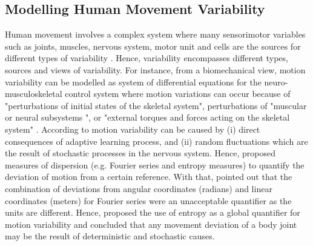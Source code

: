 \subsection{Modelling Human Movement Variability}
Human movement involves a complex system where many sensorimotor 
variables such as joints, muscles, nervous system, motor unit and cells 
are the sources for different types of variability \citep{newell1993}.
Hence, variability encompasses different types, sources and views of 
variability.
For instance, from a biomechanical view, motion variability can be modelled
as system of differential equations for the neuro-musculoskeletal 
control system where motion variations can occur because of 
"perturbations of initial states of the skeletal system",
perturbations of "muscular or neural subsystems ",
or "external torques and forces acting on the skeletal system" 
\citep[p. 13]{hatze1986}.
According to \cite{hatze1986} motion variability can be caused by 
(i) direct consequences of adaptive learning process, and 
(ii) random fluctuations which are the result of stochastic processes 
in the nervous system. Hence, \cite{hatze1986} proposed measures of 
dispersion (e.g. Fourier series and entropy measures) to quantify the 
deviation of motion from a certain reference. With that, 
\cite{hatze1986} pointed out that the combination of deviations from 
angular coordinates (radians) and linear coordinates (meters)
for Fourier series were an unacceptable quantifier as the units are different.
Hence, \cite{hatze1986} proposed the use of entropy as a global quantifier 
for motion variability and concluded that any movement deviation of a 
body joint may be the result of deterministic and stochastic causes.




